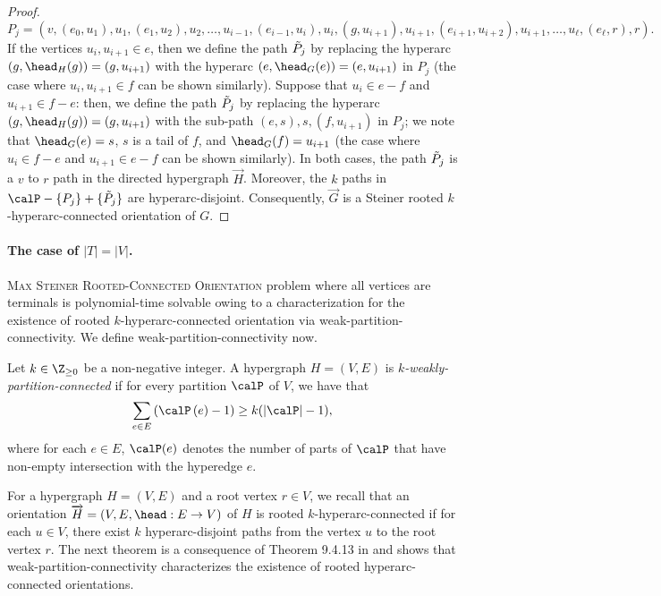 \begin{proof}
        $$P_j = \left(v, \left(e_0, u_1\right), u_1, \left(e_1, u_2\right), u_2,  \ldots, u_{i-1}, \left(e_{i-1}, u_{i}\right), u_i, \left(g, u_{i+1}\right), u_{i+1}, \left(e_{i+1}, u_{i+2}\right), u_{i+1}, \ldots, u_{\ell}, \left(e_\ell, r\right), r\right).$$ 
        If the vertices $u_i, u_{i+1} \in e$, then we define the path $\Tilde{P}_j$ by replacing the hyperarc $(g, \head_H(g))=(g, u_{i+1})$ with the hyperarc $(e, \head_G(e))=(e, u_{i+1})$ in $P_j$ (the case where $u_i, u_{i+1} \in f$ can be shown similarly). 
        Suppose that $u_i \in e-f$ and $u_{i+1} \in f-e$: then, we define the path $\Tilde{P}_j$ by replacing the hyperarc $(g, \head_H(g))=(g,u_{i+1})$ with 
        the sub-path $(e, s), s, (f, u_{i+1})$ in $P_j$; we note that $\head_G(e)=s$, $s$ is a tail of $f$, and $\head_G(f)=u_{i+1}$ (the case where $u_i \in f-e$ and $u_{i+1} \in e-f$ can be shown similarly). 
        In both cases, the path $\Tilde{P}_j$ is a $v$ to $r$ path in the directed hypergraph $\overrightarrow{H}$. Moreover, the $k$ paths in $\calP - \{P_j\} + \{\Tilde{P}_j\}$ are hyperarc-disjoint. Consequently, $\overrightarrow{G}$ is a Steiner rooted $k$-hyperarc-connected orientation of $G$.
\end{proof}

\paragraph{The case of $|T|=|V|$. } \textsc{Max Steiner Rooted-Connected Orientation} problem where all vertices are terminals is polynomial-time solvable owing to a characterization for the existence of rooted $k$-hyperarc-connected orientation via weak-partition-connectivity. We define weak-partition-connectivity now. 
\begin{definition}\label{defn:weak-partition-connectivity}
    Let $k \in \Z_{\geq 0}$ be a non-negative integer. A hypergraph $H = (V, E)$ is \emph{$k$-weakly-partition-connected} if for every partition $\calP$ of $V$, we have that $$\sum_{e \in E} \left(\calP\left(e\right) - 1\right) \geq k (|\calP| - 1),$$
    where for each $e \in E$, $\calP(e)$ denotes the number of parts of $\calP$ that have non-empty intersection with the hyperedge $e$. 
\end{definition}

For a hypergraph $H=(V, E)$ and a root vertex $r\in V$, we recall that an orientation $\overrightarrow{H}=(V, E, \head: E\rightarrow V)$ of $H$ is rooted $k$-hyperarc-connected if for each $u\in V$, there exist $k$ hyperarc-disjoint paths 
from the vertex $u$ to the root vertex $r$. 
The next theorem is a consequence of Theorem 9.4.13 in \cite{Frank-book} and shows that weak-partition-connectivity characterizes the existence of rooted hyperarc-connected orientations. 

